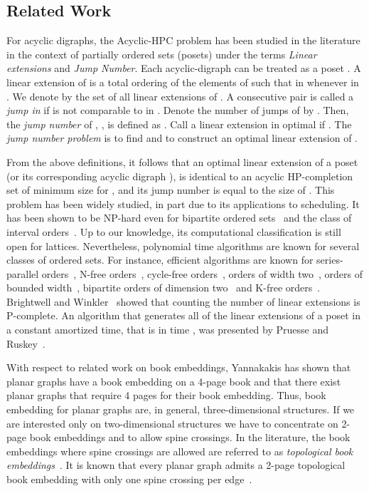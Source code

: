 \documentclass{myllncs-mixalis}
\begin{document}
\subsection{Related Work}

For acyclic digraphs, the  Acyclic-HPC problem has been studied in
the literature in the context of partially ordered sets (posets)
under the terms  \emph{Linear extensions} and \emph{Jump Number}.
Each acyclic-digraph  can be treated as a poset . A linear
extension of  is a total ordering  of the
elements of  such that  in  whenever  in
. We denote by  the set of all linear extensions of . A
consecutive pair  is called a \emph{\emph{jump} in
} if  is not comparable to  in . Denote the
number of jumps of   by . Then, the \emph{jump number}
of , , is defined as .
Call  a linear extension  in  optimal if .
The \emph{jump number problem} is to find  and to construct an
optimal linear extension of .

From the above definitions, it follows that an optimal linear
extension of a poset  (or its corresponding  acyclic digraph
), is identical to an acyclic HP-completion set  of minimum
size for , and its jump number is equal to the size of .
This problem has been widely studied, in part due to its
applications to scheduling. It has been shown to be NP-hard even for
bipartite ordered sets~\cite{Pulleyblank81} and the class of
interval orders~\cite{Mitas91}. Up to our knowledge, its
computational classification is still open for lattices.
Nevertheless, polynomial time algorithms are known for several
classes of ordered sets. For instance, efficient algorithms are
known for series-parallel orders~\cite{CogisH79}, N-free
orders~\cite{Rival83}, cycle-free orders~\cite{DuffusRW82}, orders
of width two~\cite{CheinH84}, orders of bounded
width~\cite{ColbournP85}, bipartite orders of dimension
two~\cite{SteinerS87} and K-free orders~\cite{ShararyZ91}.
Brightwell and  Winkler~\cite{BrightwellW91} showed that counting
the number of linear extensions is P-complete. An
algorithm that generates all of the linear extensions of a poset in
a constant amortized time, that is in time ,
was presented by Pruesse and Ruskey~\cite{PruesseR94}.

With respect to related work on book embeddings,
Yannakakis\cite{Yannakakis89} has shown that planar graphs have a
book embedding on a 4-page book and that there exist planar graphs
that require 4 pages for their book embedding. Thus, book embedding
for planar graphs are, in general, three-dimensional structures. If
we are interested only on two-dimensional structures we have to
concentrate on  2-page book embeddings and to allow spine crossings.
In the literature, the book embeddings where spine crossings are
allowed are referred to as \emph{topological book
embeddings}~\cite{EnomotoMO99}. It is known that every planar graph
admits a 2-page topological book embedding with only one spine
crossing per edge~\cite{DiGiacomoDLW05}.
\end{document}
